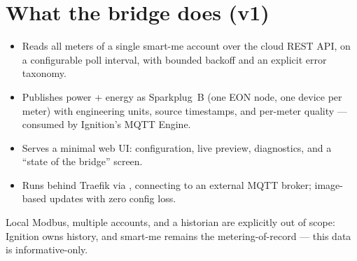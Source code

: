 \section{What the bridge does (v1)}

\begin{itemize}
  \item Reads all meters of a single smart-me account over the cloud REST API, on a
        configurable poll interval, with bounded backoff and an explicit error taxonomy.
  \item Publishes power + energy as Sparkplug~B (one EON node, one device per meter) with
        engineering units, source timestamps, and per-meter quality — consumed by
        Ignition's MQTT Engine.
  \item Serves a minimal web UI: configuration, live preview, diagnostics, and a
        “state of the bridge” screen.
  \item Runs behind Traefik via , connecting to an external MQTT
        broker; image-based updates with zero config loss.
\end{itemize}

Local Modbus, multiple accounts, and a historian are explicitly out of scope: Ignition
owns history, and smart-me remains the metering-of-record — this data is
informative-only.
